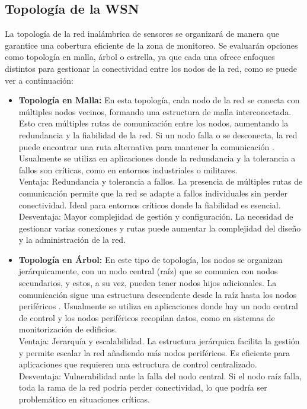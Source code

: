 \subsection{Topología de la WSN}
La topología de la red inalámbrica de sensores se organizará de manera que garantice una cobertura eficiente de la zona de monitoreo. Se evaluarán opciones como topología en malla, árbol o estrella, ya que cada una ofrece enfoques distintos para gestionar la conectividad entre los nodos de la red, como se puede ver a continuación:
\begin{itemize}
\item \textbf{Topología en Malla:} En esta topología, cada nodo de la red se conecta con múltiples nodos vecinos, formando una estructura de malla interconectada. Esto crea múltiples rutas de comunicación entre los nodos, aumentando la redundancia y la fiabilidad de la red. Si un nodo falla o se desconecta, la red puede encontrar una ruta alternativa para mantener la comunicación \cite{malla}. Usualmente se utiliza en aplicaciones donde la redundancia y la tolerancia a fallos son críticas, como en entornos industriales o militares.\\
Ventaja: Redundancia y tolerancia a fallos. La presencia de múltiples rutas de comunicación permite que la red se adapte a fallos individuales sin perder conectividad. Ideal para entornos críticos donde la fiabilidad es esencial.\\
Desventaja: Mayor complejidad de gestión y configuración. La necesidad de gestionar varias conexiones y rutas puede aumentar la complejidad del diseño y la administración de la red.
\item \textbf{Topología en Árbol:} En este tipo de  topología, los nodos se organizan jerárquicamente, con un nodo central (raíz) que se comunica con nodos secundarios, y estos, a su vez, pueden tener nodos hijos adicionales. La comunicación sigue una estructura descendente desde la raíz hasta los nodos periféricos \cite{arbol}. Usualmente se utiliza en aplicaciones donde hay un nodo central de control y los nodos periféricos recopilan datos, como en sistemas de monitorización de edificios.\\
Ventaja: Jerarquía y escalabilidad. La estructura jerárquica facilita la gestión y permite escalar la red añadiendo más nodos periféricos. Es eficiente para aplicaciones que requieren una estructura de control centralizado.\\
Desventaja: Vulnerabilidad ante la falla del nodo central. Si el nodo raíz falla, toda la rama de la red podría perder conectividad, lo que podría ser problemático en situaciones críticas.

\end{itemize}
